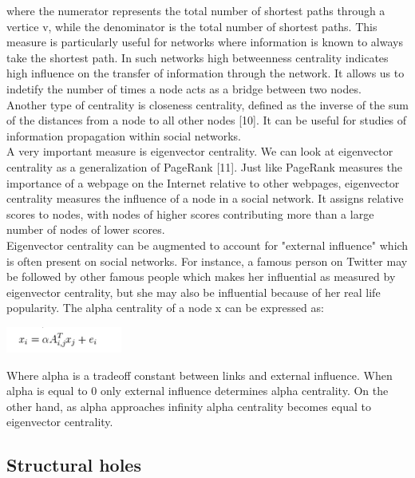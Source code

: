 \documentclass[conference,letterpaper]{IEEEtran}
\begin{document}
where the numerator represents the total number of shortest paths through a vertice v, while the denominator is the total number of shortest paths. This measure is particularly useful for networks where information is known to always take the shortest path. In such networks high betweenness centrality indicates high influence on the transfer of information through the network. It allows us to indetify the number of times a node acts as a bridge between two nodes.\\
\indent
Another type of centrality is closeness centrality, defined as the inverse of the sum of the distances from a node to all other nodes [10]. It can be useful for studies of information propagation within social networks.\\
\indent
A very important measure is eigenvector centrality. We can look at eigenvector centrality as a generalization of PageRank [11]. Just like PageRank measures the importance of a webpage on the Internet relative to other webpages, eigenvector centrality measures the influence of a node in a social network. It assigns relative scores to nodes, with nodes of higher scores contributing more than a large number of nodes of lower scores. \\
\indent
Eigenvector centrality can be augmented to account for "external influence" which is often present on social networks. For instance, a famous person on Twitter may be followed by other famous people which makes her influential as measured by eigenvector centrality, but she may also be influential because of her real life popularity. The alpha centrality of a node x can be expressed as:\\

\centerline{
  \includegraphics[width=1.5in]{alpha_centrality.png}
}

Where alpha is a tradeoff constant between links and external influence. When alpha is equal to 0 only external influence determines alpha centrality. On the other hand, as alpha approaches infinity alpha centrality becomes equal to eigenvector centrality.\\

\subsection{Structural holes}
\end{document}
